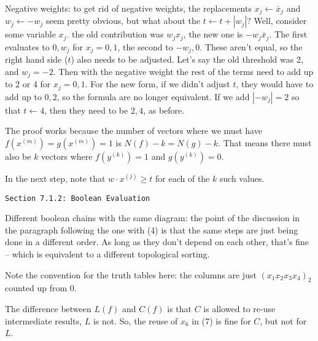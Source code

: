 \vskip0.1in \hfil\break

\noindent [p75] Negative weights: to get rid of negative weights,
the replacements $x_j \gets \bar x_j$ and $w_j \gets -w_j$ seem
pretty obvious, but what about the $t \gets t + \left|w_j\right|$?
Well, consider some variable $x_j$.  the old contribution was
$w_j x_j$, the new one is $-w_j \bar x_j$.  The first evaluates to
$0, w_j$ for $x_j = 0, 1$, the second to $-w_j, 0$.  These aren't
equal, so the right hand side ($t$) also needs to be adjusted.
Let's say the old threshold was 2, and $w_j = -2$.  Then with
the negative weight the rest of the terms need to add up to 2 or 4
for $x_j = 0, 1$.  For the new form, if we didn't adjust $t$, they
would have to add up to $0, 2$, so the formula are no longer
equivalent.  If we add $\left|-w_j\right| = 2$ so that $t \gets 4$,
then they need to be $2, 4$, as before.

\vskip 0.05in  \hfil\break
The proof works because the number
of vectors where we must have $f\left(x^{\left(m\right)}\right) = 
g\left(x^{\left(m\right)}\right) = 1$ is $N\left(f\right) - k = N\left(g\right) - k$.
That means there must also be $k$ vectors where $f\left(y^{\left(k\right)}\right) = 1$
and $g\left(y^{\left(k\right)}\right) = 0$.

In the next step, note that $w \cdot x^{\left(j\right)} \geq t$ for each of the $k$
such values. 

\vfil\break

\vskip 0.3in
\centerline{\tt Section 7.1.2: Boolean Evaluation}
\vskip0.2in

\noindent [p 97] Different boolean chains with the same diagram: the point
of the discussion in the paragraph following the one with (4) is that the same
steps are just being done in a different order.  As long as they don't depend
on each other, that's fine -- which is equivalent to a different topological sorting.

\vskip 0.05in \noindent [p 98] Note the convention for the truth tables here:
the columns are just $\left(x_1 x_2 x_3 x_4\right)_2$ counted up from 0.

\vskip 0.05in \noindent [p 99] The difference between $L\left(f\right)$
and $C\left(f\right)$ is that $C$ is allowed to re-use intermediate results,
$L$ is not.  So, the reuse of $x_6$ in (7) is fine for $C$, but not for $L$.

\vskip 0.1in 

